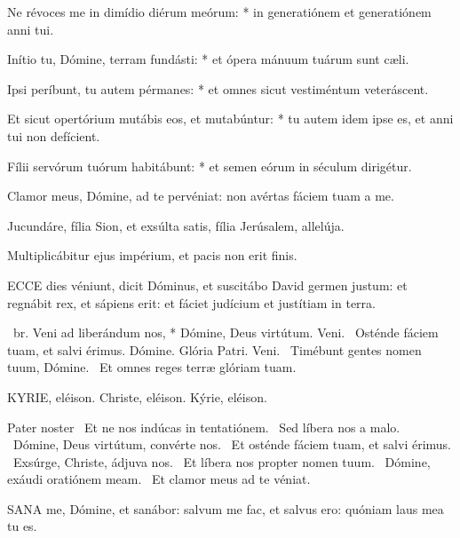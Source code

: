 Ne révoces me in dimídio diérum meórum: * in generatiónem et generatiónem anni tui.

Inítio tu, Dómine, terram fundásti: * et ópera mánuum tuárum sunt cæli.

Ipsi períbunt, tu autem pérmanes: * et omnes sicut vestiméntum veteráscent.

Et sicut opertórium mutábis eos, et mutabúntur: * tu autem idem ipse es, et anni tui non defícient.

Fílii servórum tuórum habitábunt: * et semen eórum in séculum dirigétur.

  Clamor meus, Dómine, ad te pervéniat: non avértas fáciem tuam a me.


  Jucundáre, fília Sion, et exsúlta satis, fília Jerúsalem, allelúja.

  Multiplicábitur ejus impérium, et pacis non erit finis.


\lettrine[lines=2]{E}{CCE} dies véniunt, dicit Dóminus, et suscitábo David germen justum: et regnábit rex, et sápiens erit: et fáciet judícium et justítiam in terra.

\R\ br. Veni ad liberándum nos, * Dómine, Deus virtútum. Veni. \V\ Osténde fáciem tuam, et salvi érimus. Dómine. Glória Patri. Veni. \V\ Timébunt gentes nomen tuum, Dómine. \R\ Et omnes reges terræ glóriam tuam.


KYRIE, eléison. Christe, eléison. Kýrie, eléison.

Pater noster  \V\ Et ne nos indúcas in tentatiónem. \R\ Sed líbera nos a malo. \V\ Dómine, Deus virtútum, convérte nos. \R\ Et osténde fáciem tuam, et salvi érimus. \V\ Exsúrge, Christe, ádjuva nos. \R\ Et líbera nos propter nomen tuum. \V\ Dómine, exáudi oratiónem meam. \R\ Et clamor meus ad te véniat.





\lettrine[lines=2]{S}{ANA} me, Dómine, et sanábor: salvum me fac, et salvus ero: quóniam laus mea tu es.

